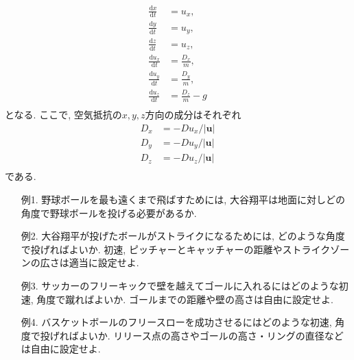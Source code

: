\begin{equation}
  \begin{aligned}
    \frac{\mathrm{d}x}{\mathrm{d}t} &= u_x,\\
    \frac{\mathrm{d}y}{\mathrm{d}t} &= u_y,\\
    \frac{\mathrm{d}z}{\mathrm{d}t} &= u_z,\\
    \frac{\mathrm{d}u_x}{\mathrm{d}t} &= \frac{D_x}{m},\\
    \frac{\mathrm{d}u_y}{\mathrm{d}t} &= \frac{D_y}{m},\\
    \frac{\mathrm{d}u_z}{\mathrm{d}t} &= \frac{D_z}{m} - g\\
  \end{aligned}
\end{equation}
となる. ここで, 空気抵抗の$x, y, z$方向の成分はそれぞれ
\begin{equation}
  \begin{aligned}
    D_x &= -D u_x / |\mathbf{u}| \\
    D_y &= -D u_y / |\mathbf{u}| \\
    D_z &= -D u_z / |\mathbf{u}| \\
  \end{aligned}
\end{equation}
である. 

\begin{itemize}
\item[例1. ]野球ボールを最も遠くまで飛ばすためには, 
大谷翔平は地面に対しどの角度で野球ボールを投げる必要があるか. 
\item[例2. ]大谷翔平が投げたボールがストライクになるためには, どのような角度で投げればよいか. 
初速, ピッチャーとキャッチャーの距離やストライクゾーンの広さは適当に設定せよ. 
\item[例3. ]サッカーのフリーキックで壁を越えてゴールに入れるにはどのような初速, 角度で蹴ればよいか. 
ゴールまでの距離や壁の高さは自由に設定せよ. 
\item[例4. ]バスケットボールのフリースローを成功させるにはどのような初速, 角度で投げればよいか. 
リリース点の高さやゴールの高さ・リングの直径などは自由に設定せよ. 
\end{itemize}


